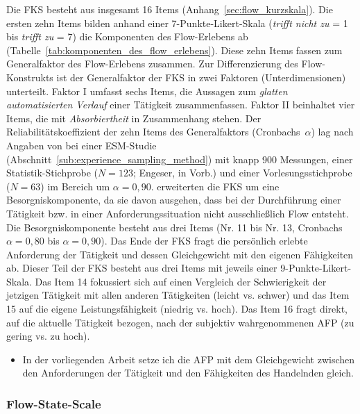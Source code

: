 Die \ac{FKS} besteht aus insgesamt 16 Items (Anhang~\ref{sec:flow_kurzskala}). Die ersten zehn Items bilden anhand einer 7-Punkte-Likert-Skala (\emph{trifft nicht zu} = 1 bis \emph{trifft zu} = 7) die Komponenten des Flow-Erlebens ab (Tabelle~\ref{tab:komponenten_des_flow_erlebens}). Diese zehn Items fassen \citet{Rheinberg2003} zum Generalfaktor des Flow-Erlebens zusammen. Zur Differenzierung des Flow-Konstrukts ist der Generalfaktor der \ac{FKS} in zwei Faktoren (Unterdimensionen) unterteilt. Faktor I umfasst sechs Items, die Aussagen zum \emph{glatten automatisierten Verlauf} einer Tätigkeit zusammenfassen. Faktor II beinhaltet vier Items, die mit \emph{Absorbiertheit} in Zusammenhang stehen. Der Reliabilitätskoeffizient der zehn Items des Generalfaktors (Cronbachs~$\alpha$) lag nach Angaben von \citet[S.~9]{Rheinberg2003} bei einer \ac{ESM}-Studie (Abschnitt~\ref{sub:experience_sampling_method}) mit knapp 900 Messungen, einer Statistik-Stichprobe ($N = 123$; Engeser, in Vorb.) und einer Vorlesungsstichprobe ($N = 63$) im Bereich um $\alpha = 0{,}90$. \citet{Rheinberg2003} erweiterten die \ac{FKS} um eine Besorgniskomponente, da sie davon ausgehen, dass bei der Durchführung einer Tätigkeit bzw. in einer Anforderungssituation nicht ausschließlich Flow entsteht. Die Besorgniskomponente besteht aus drei Items (Nr. 11 bis Nr. 13, Cronbachs $\alpha = 0{,}80$ bis $\alpha = 0{,}90$). Das Ende der \ac{FKS} fragt die persönlich erlebte Anforderung der Tätigkeit und dessen Gleichgewicht mit den eigenen Fähigkeiten ab. Dieser Teil der \ac{FKS} besteht aus drei Items mit jeweils einer 9-Punkte-Likert-Skala. Das Item 14 fokussiert sich auf einen Vergleich der Schwierigkeit der jetzigen Tätigkeit mit allen anderen Tätigkeiten (leicht vs. schwer) und das Item 15 auf die eigene Leistungsfähigkeit (niedrig vs. hoch). Das Item 16 fragt direkt, auf die aktuelle Tätigkeit bezogen, nach der subjektiv wahrgenommenen \ac{AFP} (zu gering vs. zu hoch). 
\begin{itemize}
	
	\item In der vorliegenden Arbeit setze ich die \ac{AFP} mit dem Gleichgewicht zwischen den Anforderungen der Tätigkeit und den Fähigkeiten des Handelnden gleich. 
\end{itemize}

\subsubsection{Flow-State-Scale} 

